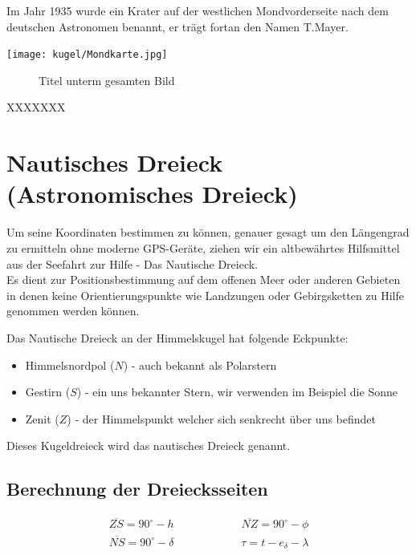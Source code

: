\begin{refsection}
Im Jahr 1935 wurde ein Krater auf der westlichen Mondvorderseite nach dem deutschen Astronomen benannt, er trägt fortan den Namen T.Mayer.

\begin{center}
        \texttt{[image: kugel/Mondkarte.jpg]}
\end{center}


\begin{figure} 
\caption{Titel unterm gesamten Bild} 
\end{figure} 


XXXXXXX


\section{Nautisches Dreieck (Astronomisches Dreieck)}
Um seine Koordinaten bestimmen zu können, genauer gesagt um den Längengrad zu ermitteln ohne moderne GPS-Geräte, ziehen wir ein altbewährtes Hilfsmittel aus der Seefahrt zur Hilfe - Das Nautische Dreieck. \\
Es dient zur Positionsbestimmung auf dem offenen Meer oder anderen Gebieten in denen keine Orientierungspunkte wie Landzungen oder Gebirgsketten zu Hilfe genommen werden können.

Das Nautische Dreieck an der Himmelskugel hat folgende Eckpunkte:
\begin{itemize}
\item Himmelsnordpol ($N$) - auch bekannt als Polarstern
\item Gestirn ($S$) - ein uns bekannter Stern, wir verwenden im Beispiel die Sonne
\item Zenit ($Z$) - der Himmelspunkt welcher sich senkrecht über uns befindet
\end{itemize}

Dieses Kugeldreieck wird das nautisches Dreieck genannt.


\subsection{Berechnung der Dreiecksseiten}

\begin{align*}
\overline{ZS} = 90^{\circ} - h \quad \quad \quad \quad \quad \quad 
\overline{NZ} = 90^{\circ} - \phi \\
\overline{NS} = 90^{\circ} - \delta \quad \quad \quad \quad \quad \quad 
\tau = t - e_\delta - \lambda 
\end{align*}
 


\end{refsection}
